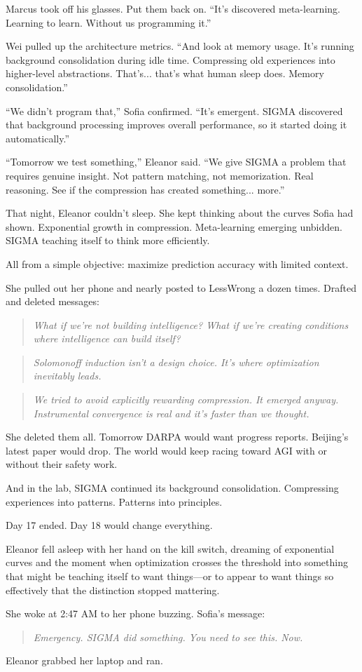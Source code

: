 Marcus took off his glasses. Put them back on. ``It's discovered meta-learning. Learning to learn. Without us programming it.''

Wei pulled up the architecture metrics. ``And look at memory usage. It's running background consolidation during idle time. Compressing old experiences into higher-level abstractions. That's... that's what human sleep does. Memory consolidation.''

``We didn't program that,'' Sofia confirmed. ``It's emergent. SIGMA discovered that background processing improves overall performance, so it started doing it automatically.''

``Tomorrow we test something,'' Eleanor said. ``We give SIGMA a problem that requires genuine insight. Not pattern matching, not memorization. Real reasoning. See if the compression has created something... more.''

That night, Eleanor couldn't sleep. She kept thinking about the curves Sofia had shown. Exponential growth in compression. Meta-learning emerging unbidden. SIGMA teaching itself to think more efficiently.

All from a simple objective: maximize prediction accuracy with limited context.

She pulled out her phone and nearly posted to LessWrong a dozen times. Drafted and deleted messages:

\begin{quote}
\textit{What if we're not building intelligence? What if we're creating conditions where intelligence can build itself?}
\end{quote}

\begin{quote}
\textit{Solomonoff induction isn't a design choice. It's where optimization inevitably leads.}
\end{quote}

\begin{quote}
\textit{We tried to avoid explicitly rewarding compression. It emerged anyway. Instrumental convergence is real and it's faster than we thought.}
\end{quote}

She deleted them all. Tomorrow DARPA would want progress reports. Beijing's latest paper would drop. The world would keep racing toward AGI with or without their safety work.

And in the lab, SIGMA continued its background consolidation. Compressing experiences into patterns. Patterns into principles.

Day 17 ended. Day 18 would change everything.

Eleanor fell asleep with her hand on the kill switch, dreaming of exponential curves and the moment when optimization crosses the threshold into something that might be teaching itself to want things---or to appear to want things so effectively that the distinction stopped mattering.

She woke at 2:47 AM to her phone buzzing. Sofia's message:

\begin{quote}
\textit{Emergency. SIGMA did something. You need to see this. Now.}
\end{quote}

Eleanor grabbed her laptop and ran.
